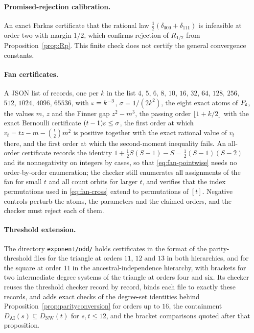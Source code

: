 \paragraph{Promised-rejection calibration.}
An exact Farkas certificate that the rational law $\tfrac12(\delta_{000}+\delta_{111})$ is infeasible at order two with margin $1/2$, which confirms rejection of $R_{1/2}$ from Proposition~\ref{prop:Rp}. This finite check does not certify the general convergence constants.

\paragraph{Fan certificates.}
A JSON list of records, one per $k$ in the list $4$, $5$, $6$, $8$, $10$, $16$, $32$, $64$, $128$, $256$, $512$, $1024$, $4096$, $65536$, with $\varepsilon=k^{-3}$, $\sigma=1/(2k^2)$, the eight exact atoms of $P_\varepsilon$, the values $m$, $z$ and the Finner gap $z^2-m^3$, the passing order $\lfloor1+k/2\rfloor$ with the exact Bernoulli certificate $(t-1)\varepsilon\le\sigma$, the first order at which $v_t=tz-m-\binom t2m^2$ is positive together with the exact rational value of $v_t$ there, and the first order at which the second-moment inequality fails. An all-order certificate records the identity $1+\tfrac12S(S-1)-S=\tfrac12(S-1)(S-2)$ and its nonnegativity on integers by cases, so that \eqref{eq:fan-pointwise} needs no order-by-order enumeration; the checker still enumerates all assignments of the fan for small $t$ and all count orbits for larger $t$, and verifies that the index permutations used in \eqref{eq:fan-cross} extend to permutations of $[t]$. Negative controls perturb the atoms, the parameters and the claimed orders, and the checker must reject each of them.



\paragraph{Threshold extension.}
The directory \texttt{exponent/odd/} holds certificates in the format of the parity-threshold files for the triangle at orders $11$, $12$ and $13$ in both hierarchies, and for the square at order $11$ in the ancestral-independence hierarchy, with brackets for two intermediate degree systems of the triangle at orders four and six. Its checker reuses the threshold checker record by record, binds each file to exactly these records, and adds exact checks of the degree-set identities behind Proposition~\ref{prop:parityconversion} for orders up to $16$, the containment $D_{\mathrm{AI}}(s)\subseteq D_{\mathrm{NW}}(t)$ for $s,t\le12$, and the bracket comparisons quoted after that proposition.


